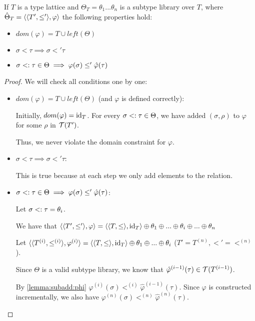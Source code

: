 \documentclass[main.tex]{subfiles}
\begin{document}
\begin{prop}
    If $T$ is a type lattice and
    $\Theta_T = \theta_1 ... \theta_n$ is a subtype library over $T$, where
    $\hat{\Theta}_T = \langle \langle  T',  \leq'  \rangle, \varphi \rangle$
    the following properties hold:
    \begin{itemize}
        \item $dom(\varphi) = T \cup left(\Theta)$
        \item $\sigma \less \tau \implies \sigma \less' \tau$
        \item $\sigma <: \tau \in \Theta \implies \varphi(\sigma) \leq' \hat{\varphi}(\tau)$
    \end{itemize}
\end{prop}
\begin{proof}
    We will check all conditions one by one:
    \begin{itemize}
        \item $dom(\varphi) = T \cup left(\Theta)$ (and $\varphi$ is defined correctly):

            Initially, $dom(\varphi) = \mathrm{id}_T$.
            For every $\sigma <: \tau \in \Theta$, we have added
            $(\sigma, \rho)$ to $\varphi$ for some $\rho$ in $\mathcal{T}( T' )$.

            Thus, we never violate the domain constraint for $\varphi$.

        \item $\sigma \less \tau \implies \sigma \less' \tau$:

            This is true because
            at each step we only add elements to the relation.
        \item $\sigma <: \tau \in \Theta \implies \varphi(\sigma) \leq' \hat{\varphi}(\tau)$:

            Let $\sigma <: \tau = \theta_i$.

            We have that
            $\langle \langle  T',  \leq'  \rangle, \varphi \rangle
                = \langle \langle  T,  \leq  \rangle, \mathrm{id}_T \rangle
                \oplus \theta_1 \oplus ... \oplus \theta_i \oplus ... \oplus \theta_n$

            Let
            $\langle \langle  T^{(i)},  \leq^{(i)}  \rangle, \varphi^{(i)} \rangle
                = \langle \langle  T,  \leq  \rangle, \mathrm{id}_T \rangle
                \oplus \theta_1 \oplus ... \oplus \theta_i$ \quad ($T' = T^{(n)},
                \less' = \less^{(n)}$).

            Since $\Theta$ is a valid subtype library, we know that
            $\hat{\varphi}^{(i - 1)}(\tau) \in \mathcal{T}( T^{(i - 1)} )$.

            By \cref{lemma:subadd:phi} $\varphi^{(i)}(\sigma) \less^{(i)}
            \hat{\varphi}^{(i - 1)}(\tau)$. Since $\varphi$ is constructed
            incrementally, we also have $\varphi^{(n)}(\sigma) \less^{(n)}
            \hat{\varphi}^{(n)}(\tau)$.
    \end{itemize}
\end{proof}
\end{document}
